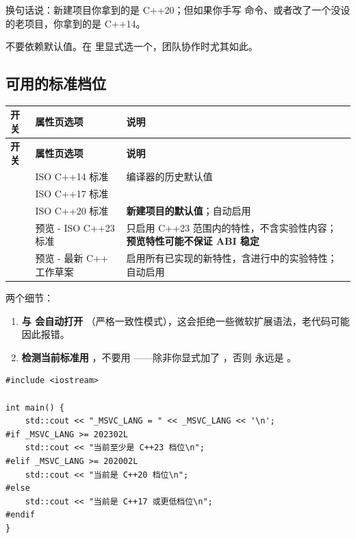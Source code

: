 换句话说：新建项目你拿到的是 C++20；但如果你手写  命令、或者改了一个没设  的老项目，你拿到的是 C++14。

\begin{tipbox}[提示]
不要依赖默认值。在  里显式选一个，团队协作时尤其如此。
\end{tipbox}

\subsection{可用的标准档位}
\begin{longtable}{L{4.8cm}L{3.8cm}L{6.0cm}}
\toprule
\textbf{开关} & \textbf{属性页选项} & \textbf{说明} \\
\midrule
\endfirsthead
\toprule
\textbf{开关} & \textbf{属性页选项} & \textbf{说明} \\
\midrule
\endhead
\bottomrule
\endlastfoot
{} & ISO C++14 标准 & 编译器的历史默认值 \\
 & ISO C++17 标准 & \\
 & ISO C++20 标准 & \textbf{新建项目的默认值}；自动启用  \\
 & 预览 - ISO C++23 标准 & 只启用 C++23 范围内的特性，不含实验性内容；\textbf{预览特性可能不保证 ABI 稳定} \\
 & 预览 - 最新 C++ 工作草案 & 启用所有已实现的新特性，含进行中的实验特性；自动启用  \\
\end{longtable}

两个细节：

\begin{enumerate}
  \item \textbf{ 与  会自动打开 }（严格一致性模式），这会拒绝一些微软扩展语法，老代码可能因此报错。
  \item \textbf{检测当前标准用 }，不要用 ——除非你显式加了 ，否则  永远是 。
\end{enumerate}

\begin{lstlisting}[style=cppstyle]
#include <iostream>

int main() {
    std::cout << "_MSVC_LANG = " << _MSVC_LANG << '\n';
#if _MSVC_LANG >= 202302L
    std::cout << "当前至少是 C++23 档位\n";
#elif _MSVC_LANG >= 202002L
    std::cout << "当前是 C++20 档位\n";
#else
    std::cout << "当前是 C++17 或更低档位\n";
#endif
}
\end{lstlisting}

